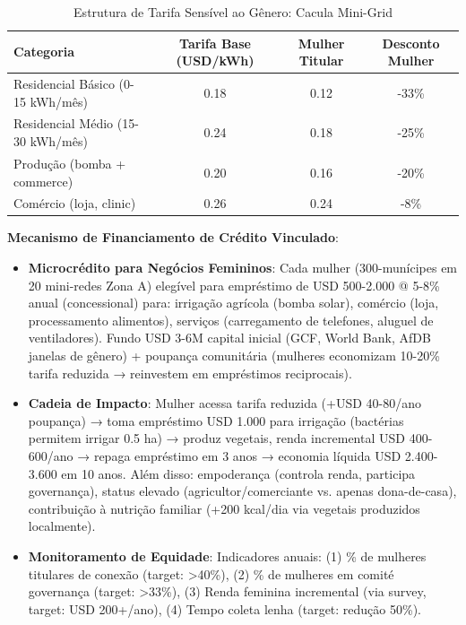 \documentclass[12pt, a4paper]{article}
\begin{document}
{{{{{{{{{{{{\begin{table}[H]
\centering
\caption{Estrutura de Tarifa Sensível ao Gênero: Cacula Mini-Grid}
\label{tab:gender_tariff}
\small
\begin{tabular}{|l|c|c|c|}
\hline
\textbf{Categoria} & \textbf{Tarifa Base (USD/kWh)} & \textbf{Mulher Titular} & \textbf{Desconto Mulher} \\
\hline
Residencial Básico (0-15 kWh/mês) & 0.18 & 0.12 & -33\% \\
Residencial Médio (15-30 kWh/mês) & 0.24 & 0.18 & -25\% \\
Produção (bomba + commerce) & 0.20 & 0.16 & -20\% \\
Comércio (loja, clinic) & 0.26 & 0.24 & -8\% \\
\hline
\end{tabular}
\end{table}

\textbf{Mecanismo de Financiamento de Crédito Vinculado}:
\begin{itemize}
\item \textbf{Microcrédito para Negócios Femininos}: Cada mulher (300-munícipes em 20 mini-redes Zona A) elegível para empréstimo de USD 500-2.000 @ 5-8\% anual (concessional) para: irrigação agrícola (bomba solar), comércio (loja, processamento alimentos), serviços (carregamento de telefones, aluguel de ventiladores). Fundo USD 3-6M capital inicial (GCF, World Bank, AfDB janelas de gênero) + poupança comunitária (mulheres economizam 10-20\% tarifa reduzida → reinvestem em empréstimos reciprocais).

\item \textbf{Cadeia de Impacto}: Mulher acessa tarifa reduzida (+USD 40-80/ano poupança) → toma empréstimo USD 1.000 para irrigação (bactérias permitem irrigar 0.5 ha) → produz vegetais, renda incremental USD 400-600/ano → repaga empréstimo em 3 anos → economia líquida USD 2.400-3.600 em 10 anos. Além disso: empoderança (controla renda, participa governança), status elevado (agricultor/comerciante vs. apenas dona-de-casa), contribuição à nutrição familiar (+200 kcal/dia via vegetais produzidos localmente).

\item \textbf{Monitoramento de Equidade}: Indicadores anuais: (1) \% de mulheres titulares de conexão (target: >40\%), (2) \% de mulheres em comité governança (target: >33\%), (3) Renda feminina incremental (via survey, target: USD 200+/ano), (4) Tempo coleta lenha (target: redução 50\%).
\end{itemize}

}}}}}}}}}}}}
\end{document}
